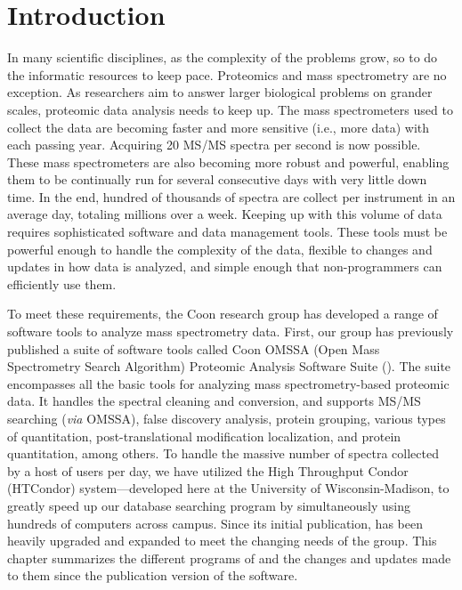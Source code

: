 \section{Introduction}
In many scientific disciplines, as the complexity of the problems grow, so to do the informatic resources to keep pace. Proteomics and mass spectrometry are no exception. As researchers aim to answer larger biological problems on grander scales, proteomic data analysis needs to keep up. The mass spectrometers used to collect the data are becoming faster and more sensitive (i.e., more data) with each passing year. Acquiring 20 MS/MS spectra per second is now possible. These mass spectrometers are also becoming more robust and powerful, enabling them to be continually run for several consecutive days with very little down time. In the end, hundred of thousands of spectra are collect per instrument in an average day, totaling millions over a week. Keeping up with this volume of data requires sophisticated software and data management tools. These tools must be powerful enough to handle the complexity of the data, flexible to changes and updates in how data is analyzed, and simple enough that non-programmers can efficiently use them. 

To meet these requirements, the Coon research group has developed a range of software tools to analyze mass spectrometry data. First, our group has previously published a suite of software tools called Coon OMSSA (Open Mass Spectrometry Search Algorithm)\cite{omssa} Proteomic Analysis Software Suite (\compass{}).\cite{compass} The suite encompasses all the basic tools for analyzing mass spectrometry-based proteomic data. It handles the spectral cleaning and conversion, and supports MS/MS searching (\emph{via} OMSSA), false discovery analysis, protein grouping, various types of quantitation, post-translational modification localization, and protein quantitation, among others. To handle the massive number of spectra collected by a host of users per day, we have utilized the High Throughput Condor (HTCondor) system---developed here at the University of Wisconsin-Madison, to greatly speed up our database searching program by simultaneously using hundreds of computers across campus. Since its initial publication, \compass{} has been heavily upgraded and expanded to meet the changing needs of the group. This chapter summarizes the different programs of \compass{} and the changes and updates made to them since the publication version of the software.

